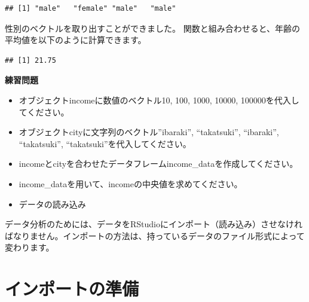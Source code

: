\documentclass[
]{book}
\newenvironment{Shaded}{\begin{snugshade}}{\end{snugshade}}
\newcommand{\FunctionTok}[1]{\textcolor[rgb]{0.00,0.00,0.00}{#1}}
\newcommand{\NormalTok}[1]{#1}
\newcommand{\SpecialCharTok}[1]{\textcolor[rgb]{0.00,0.00,0.00}{#1}}
\begin{document}
\begin{Shaded}
\end{Shaded}

\begin{verbatim}
## [1] "male"   "female" "male"   "male"
\end{verbatim}

性別のベクトルを取り出すことができました。 関数と組み合わせると、年齢の平均値を以下のように計算できます。

\begin{Shaded}
\end{Shaded}

\begin{verbatim}
## [1] 21.75
\end{verbatim}

\textbf{練習問題}

\begin{itemize}
\item
  オブジェクトincomeに数値のベクトル10, 100, 1000, 10000, 100000を代入してください。\\
\item
  オブジェクトcityに文字列のベクトル''ibaraki'', ``takatsuki'', ``ibaraki'', ``takatsuki'', ``takatsuki''を代入してください。\\
\item
  incomeとcityを合わせたデータフレームincome\_dataを作成してください。\\
\item
  income\_dataを用いて、incomeの中央値を求めてください。
\item
  データの読み込み
\end{itemize}

データ分析のためには、データをRStudioにインポート（読み込み）させなければなりません。インポートの方法は、持っているデータのファイル形式によって変わります。

\hypertarget{ux30a4ux30f3ux30ddux30fcux30c8ux306eux6e96ux5099}{%
\section{インポートの準備}\label{ux30a4ux30f3ux30ddux30fcux30c8ux306eux6e96ux5099}}
\end{document}
